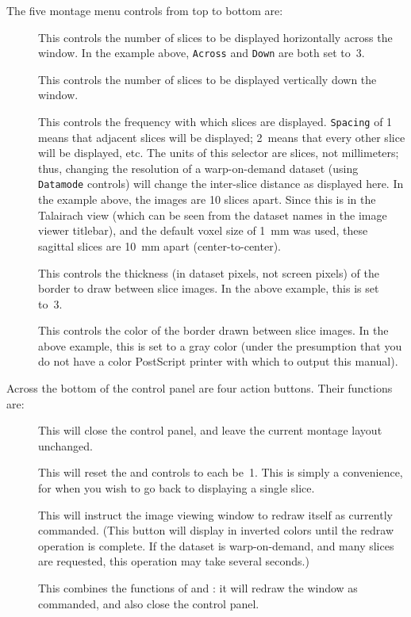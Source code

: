 \noindent
The five montage menu controls from top to bottom are:
\begin{description}
  \item[\blob{}]
    This controls the number of slices to be displayed horizontally
    across the window.  In the example above, {\tt Across} and {\tt Down}
    are both set to~3.

  \item[\blob{}]
    This controls the number of slices to be displayed vertically down the window.

  \item[\blob{}]
    This controls the frequency with which slices are displayed.  {\tt Spacing}
    of 1 means that adjacent slices will be displayed;  2~means that every other
    slice will be displayed, etc.  The units of this selector are slices,
    not millimeters; thus, changing the resolution of a warp-on-demand
    dataset (using {\tt Datamode} controls) will change the inter-slice
    distance as displayed here.  In the example above, the images
    are 10 slices apart.  Since this is in the Talairach view (which can
    be seen from the dataset names in the image viewer titlebar), and
    the default voxel size of 1~mm was used, these sagittal slices
    are 10~mm apart (center-to-center).

  \item[\blob{}]
    This controls the thickness (in dataset pixels, not screen pixels)
    of the border to draw between slice images.  In the above example,
    this is set to~3.

  \item[\blob{}]
    This controls the color of the border drawn between slice images.
    In the above example, this is set to a gray color (under the presumption
    that you do not have a color PostScript printer with which to output this manual).
\end{description}
Across the bottom of the  control panel are four
action buttons.  Their functions are:
\begin{description}
  \item[\blob{}]
    This will close the  control panel, and leave
    the current montage layout unchanged.

  \item[\blob{}]
    This will reset the  and 
    controls to each be~1.  This is simply a convenience, for
    when you wish to go back to displaying a single slice.

  \item[\blob{}]
    This will instruct the image viewing window to redraw itself
    as currently commanded.  (This button will display in inverted
    colors until the redraw operation is complete.  If the dataset
    is warp-on-demand, and many slices are requested, this operation
    may take several seconds.)

  \item[\blob{}]
    This combines the functions of  and :
    it will redraw the window as commanded, and also close the
     control panel.
\end{description}
